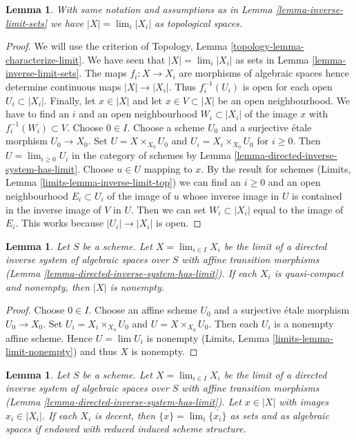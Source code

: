 \documentclass{stacks-project}
\theoremstyle{plain}
\newtheorem{lemma}[subsection]{Lemma}
\theoremstyle{definition}
\theoremstyle{remark}
\numberwithin{equation}{subsection}
\def\lim{\mathop{\mathrm{lim}}\nolimits}
\begin{document}
\begin{lemma}
\label{lemma-topology-limit}
With same notation and assumptions as in Lemma \ref{lemma-inverse-limit-sets}
we have $|X| = \lim_i |X_i|$ as topological spaces.
\end{lemma}

\begin{proof}
We will use the criterion of
Topology, Lemma \ref{topology-lemma-characterize-limit}.
We have seen that $|X| = \lim_i |X_i|$ as sets in
Lemma \ref{lemma-inverse-limit-sets}.
The maps $f_i : X \to X_i$ are morphisms of algebraic spaces
hence determine continuous maps $|X| \to |X_i|$.
Thus $f_i^{-1}(U_i)$ is open for each
open $U_i \subset |X_i|$. Finally, 
let $x \in |X|$ and let $x \in V \subset |X|$ be an open
neighbourhood. We have to find an $i$ and an open neighbourhood
$W_i \subset |X_i|$ of the image $x$
with $f_i^{-1}(W_i) \subset V$.
Choose $0 \in I$. Choose a scheme $U_0$ and a surjective
\'etale morphism $U_0 \to X_0$. Set $U = X \times_{X_0} U_0$
and $U_i = X_i \times_{X_0} U_0$ for $i \geq 0$.
Then $U = \lim_{i \geq 0} U_i$ in the category of schemes by
Lemma \ref{lemma-directed-inverse-system-has-limit}.
Choose $u \in U$ mapping to $x$. By the result for schemes
(Limits, Lemma \ref{limits-lemma-inverse-limit-top})
we can find an $i \geq 0$ and an open neighbourhood
$E_i \subset U_i$ of the image of $u$
whose inverse image in $U$ is contained in the
inverse image of $V$ in $U$. Then we can set $W_i \subset |X_i|$
equal to the image of $E_i$. This works because $|U_i| \to |X_i|$ is open.
\end{proof}

\begin{lemma}
\label{lemma-limit-nonempty}
Let $S$ be a scheme. Let $X = \lim_{i \in I} X_i$ be the limit of a directed
inverse system of algebraic spaces over $S$ with affine transition morphisms
(Lemma \ref{lemma-directed-inverse-system-has-limit}). If each $X_i$
is quasi-compact and nonempty, then $|X|$ is nonempty.
\end{lemma}

\begin{proof}
Choose $0 \in I$.
Choose an affine scheme $U_0$ and a surjective \'etale morphism $U_0 \to X_0$.
Set $U_i = X_i \times_{X_0} U_0$ and $U = X \times_{X_0} U_0$.
Then each $U_i$ is a nonempty affine scheme. Hence $U = \lim U_i$
is nonempty (Limits, Lemma \ref{limits-lemma-limit-nonempty}) and thus
$X$ is nonempty.
\end{proof}

\begin{lemma}
\label{lemma-inverse-limit-irreducibles}
Let $S$ be a scheme. Let $X = \lim_{i \in I} X_i$ be the limit of a directed
inverse system of algebraic spaces over $S$ with affine transition morphisms
(Lemma \ref{lemma-directed-inverse-system-has-limit}).
Let $x \in |X|$ with images $x_i \in |X_i|$. If each $X_i$ is decent,
then $\overline{\{x\}} = \lim_i \overline{\{x_i\}}$ as sets
and as algebraic spaces if endowed with reduced induced scheme structure.
\end{lemma}
\end{document}
